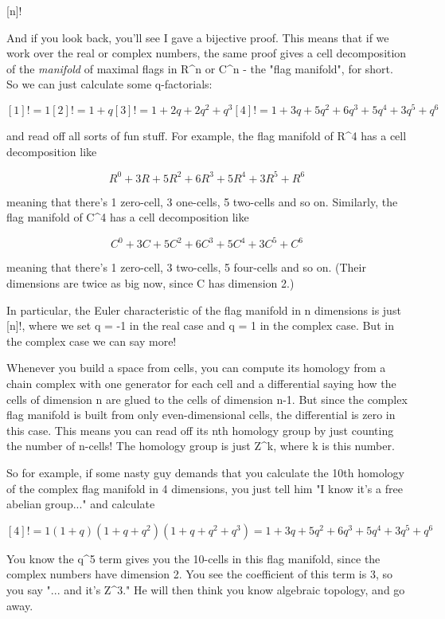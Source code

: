 [n]!  


And if you look back, you'll see I gave a bijective proof.  This means
that if we work over the real or complex numbers, the same proof gives a
cell decomposition of the \emph{manifold} of maximal flags in
R^{n} or C^{n} - the "flag manifold", for
short.  So we can just calculate some q-factorials:

$$
[1]! = 1 
[2]! = 1 + q
[3]! = 1 + 2q + 2q^{2} +  q^{3}
[4]! = 1 + 3q + 5q^{2} + 6q^{3} + 5q^{4} + 3q^{5} + q^{6}
$$
    
and read off all sorts of fun stuff.  For example, the flag manifold
of R^{4} has a cell decomposition like

$$
     R^{0} + 3R + 5R^{2} + 6R^{3} + 5R^{4} + 3R^{5} + R^{6}
$$
    
meaning that there's 1 zero-cell, 3 one-cells, 5 two-cells and so on.
Similarly, the flag manifold of C^{4} has a cell decomposition like

$$
     C^{0} + 3C + 5C^{2} + 6C^{3} + 5C^{4} + 3C^{5} + C^{6}
$$
    
meaning that there's 1 zero-cell, 3 two-cells, 5 four-cells and so on.
(Their dimensions are twice as big now, since C has dimension 2.)

In particular, the Euler characteristic of the flag manifold in 
n dimensions is just [n]!, where we set q = -1 in the real case and 
q = 1 in the complex case.  But in the complex case we can say more!

Whenever you build a space from cells, you can compute its homology from
a chain complex with one generator for each cell and a differential
saying how the cells of dimension n are glued to the cells of dimension
n-1.   But since the complex flag manifold is built from only
even-dimensional cells, the differential is zero in this case.  This
means you can read off its nth homology group by just counting the
number of n-cells!  The homology group is just Z^{k}, 
where k is this number.

So for example, if some nasty guy demands that you calculate the 10th
homology of the complex flag manifold in 4 dimensions, you just tell
him "I know it's a free abelian group..." and calculate 

$$
[4]! = 1 (1 + q) (1 + q + q^{2}) (1 + q + q^{2} + q^{3}) 
     = 1 + 3q + 5q^{2} + 6q^{3} + 5q^{4} + 3q^{5} + q^{6}
$$
    
You know the q^{5} term gives you the 10-cells in this flag manifold,
since the complex numbers have dimension 2.  You see the coefficient of
this term is 3, so you say "... and it's Z^{3}."  He will then think you 
know algebraic topology, and go away.

